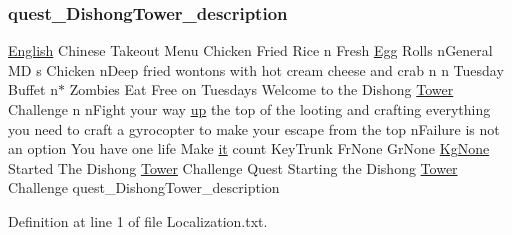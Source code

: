 \subsubsection{\texorpdfstring{quest\_DishongTower\_description}{quest\_DishongTower\_description}}
{\footnotesize\ttfamily \mbox{\hyperlink{_sphere_i_i_01_winter_01_project_2_config_2_localization_8txt_ad896b63205779b1b09e86d941ce13976}{English}} Chinese Takeout Menu Chicken Fried Rice n Fresh \mbox{\hyperlink{_sphere_i_i_01_winter_01_project_2_config_2_localization_8txt_a55334ab0b48a68a93004334728020f15}{Egg}} Rolls n\+General MD s Chicken n\+Deep fried wontons with hot cream cheese and crab n n Tuesday Buffet n$\ast$ Zombies Eat Free on Tuesdays Welcome to the Dishong \mbox{\hyperlink{_dishong_01_tower_01_challenge_2_config_2_localization_8txt_ad03a7286db82f171f8e82a1eaf4e3eaf}{Tower}} Challenge n n\+Fight your way \mbox{\hyperlink{_the_01_restless_01_curse_2_config_2_localization_01-_01_quest_8txt_a2f8d5a9cc6c08e259de10d34d28f85c4}{up}} the top of the looting and crafting everything you need to craft a gyrocopter to make your escape from the top n\+Failure is not an option You have one life Make \mbox{\hyperlink{_the_01_restless_01_curse_2_config_2_localization_01-_01_quest_8txt_a741b285909bea4855b886664c2dcd50c}{it}} count Key\+Trunk Fr\+None Gr\+None \mbox{\hyperlink{_the_01_restless_01_curse_2_config_2_localization_8txt_acc1c43e0980c5828bcfaf85313744919}{Kg\+None}} Started The Dishong \mbox{\hyperlink{_dishong_01_tower_01_challenge_2_config_2_localization_8txt_ad03a7286db82f171f8e82a1eaf4e3eaf}{Tower}} Challenge Quest Starting the Dishong \mbox{\hyperlink{_dishong_01_tower_01_challenge_2_config_2_localization_8txt_ad03a7286db82f171f8e82a1eaf4e3eaf}{Tower}} Challenge quest\+\_\+\+Dishong\+Tower\+\_\+description}



Definition at line 1 of file Localization.\+txt.

\mbox{\label{_dishong_01_tower_01_challenge_2_config_2_localization_8txt_ab2dc17ed289364d20a91e96732489428}} 
